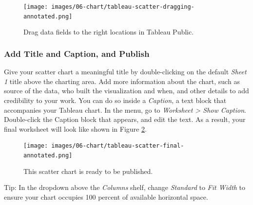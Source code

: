 \documentclass[
  english,
]{book}
\begin{document}
\begin{figure}
\centering
\texttt{[image: images/06-chart/tableau-scatter-dragging-annotated.png]}
\caption{\label{fig:tableau-scatter-dragging}Drag data fields to the right locations in Tableau Public.}
\end{figure}

\hypertarget{add-title-and-caption-and-publish}{%
\subsubsection*{Add Title and Caption, and Publish}\label{add-title-and-caption-and-publish}}

Give your scatter chart a meaningful title by double-clicking on the default \emph{Sheet 1} title
above the charting area. Add more information about the chart, such as source of the data, who built the visualization and when, and other details to add credibility to your work. You can do so inside a \emph{Caption}, a text block that accompanies your Tableau chart. In the menu, go to \emph{Worksheet \textgreater{} Show Caption}. Double-click
the Caption block that appears, and edit the text. As a result, your final worksheet will look like shown in Figure \ref{fig:tableau-scatter-final}.



\begin{figure}
\centering
\texttt{[image: images/06-chart/tableau-scatter-final-annotated.png]}
\caption{\label{fig:tableau-scatter-final}This scatter chart is ready to be published.}
\end{figure}

Tip: In the dropdown above the \emph{Columns} shelf, change \emph{Standard} to \emph{Fit Width} to ensure your chart occupies 100 percent of available horizontal space.
\end{document}
